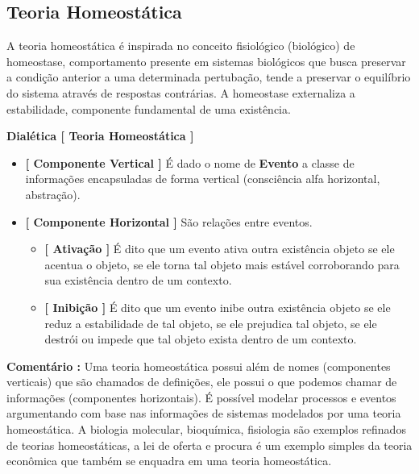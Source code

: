 \documentclass[10pt,a4paper]{report}
\begin{document}

\subsection{Teoria Homeostática}

\hspace{\baselineskip}

A teoria homeostática é inspirada no conceito fisiológico (biológico) de homeostase, comportamento presente em sistemas biológicos que busca preservar a condição anterior a uma determinada pertubação, tende a preservar o equilíbrio do sistema através de respostas contrárias. A homeostase externaliza a estabilidade, componente fundamental de uma existência.

\hspace{\baselineskip}

\textbf{Dialética [ Teoria Homeostática ]} 

\begin{itemize}
	\item[ (i) ] \textbf{[ Componente Vertical ]} É dado o nome de \textbf{Evento} a classe de informações encapsuladas de forma vertical (consciência alfa horizontal, abstração).
	\item[ (ii) ] \textbf{[ Componente Horizontal ]} São relações entre eventos.
	\begin{itemize}
		\item[ (i) ] \textbf{[ Ativação ]} É dito que um evento ativa outra existência objeto se ele acentua o objeto, se ele torna tal objeto mais estável corroborando para sua existência dentro de um contexto.
		\item[ (ii) ] \textbf{[ Inibição ]} É dito que um evento inibe outra existência objeto se ele reduz a estabilidade de tal objeto, se ele prejudica tal objeto, se ele destrói ou impede que tal objeto exista dentro de um contexto.
	\end{itemize}
\end{itemize}

\textbf{Comentário :} Uma teoria homeostática possui além de nomes (componentes verticais) que são chamados de definições, ele possui o que podemos chamar de informações (componentes horizontais). É possível modelar processos e eventos argumentando com base nas informações de sistemas modelados por uma teoria homeostática. A biologia molecular, bioquímica, fisiologia são exemplos refinados de teorias homeostáticas, a lei de oferta e procura é um exemplo simples da teoria econômica que também se enquadra em uma teoria homeostática.
\end{document}
